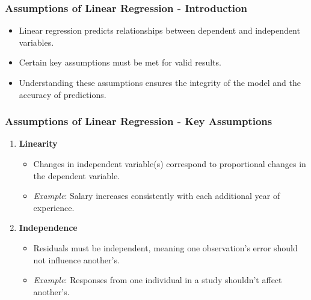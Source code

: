 \documentclass[aspectratio=169]{beamer}
\begin{document}
\begin{frame}[fragile]
    \frametitle{Assumptions of Linear Regression - Introduction}
    \begin{itemize}
        \item Linear regression predicts relationships between dependent and independent variables.
        \item Certain key assumptions must be met for valid results.
        \item Understanding these assumptions ensures the integrity of the model and the accuracy of predictions.
    \end{itemize}
\end{frame}

\begin{frame}[fragile]
    \frametitle{Assumptions of Linear Regression - Key Assumptions}
    \begin{enumerate}
        \item \textbf{Linearity}
            \begin{itemize}
                \item Changes in independent variable(s) correspond to proportional changes in the dependent variable.
                \item \textit{Example}: Salary increases consistently with each additional year of experience.
            \end{itemize}
            
        \item \textbf{Independence}
            \begin{itemize}
                \item Residuals must be independent, meaning one observation's error should not influence another's.
                \item \textit{Example}: Responses from one individual in a study shouldn't affect another's.
            \end{itemize}
    \end{enumerate}
\end{frame}
\end{document}
